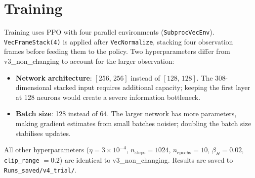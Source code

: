 \documentclass[11pt, a4paper]{article}
\begin{document}
\section{Training}

Training uses PPO with four parallel environments (\texttt{SubprocVecEnv}).
\texttt{VecFrameStack(4)} is applied after \texttt{VecNormalize}, stacking
four observation frames before feeding them to the policy.
Two hyperparameters differ from v3\_non\_changing to account for the larger
observation:
\begin{itemize}
    \item \textbf{Network architecture}: $[256,\,256]$ instead of $[128,\,128]$.
          The 308-dimensional stacked input requires additional capacity; keeping
          the first layer at 128 neurons would create a severe information
          bottleneck.
    \item \textbf{Batch size}: 128 instead of 64.
          The larger network has more parameters, making gradient estimates from
          small batches noisier; doubling the batch size stabilises updates.
\end{itemize}
All other hyperparameters ($\eta = 3\times10^{-4}$, $n_\text{steps} = 1024$,
$n_\text{epochs} = 10$, $\beta_H = 0.02$, \texttt{clip\_range} $= 0.2$)
are identical to v3\_non\_changing.
Results are saved to \texttt{Runs\_saved/v4\_trial/}.
\end{document}

